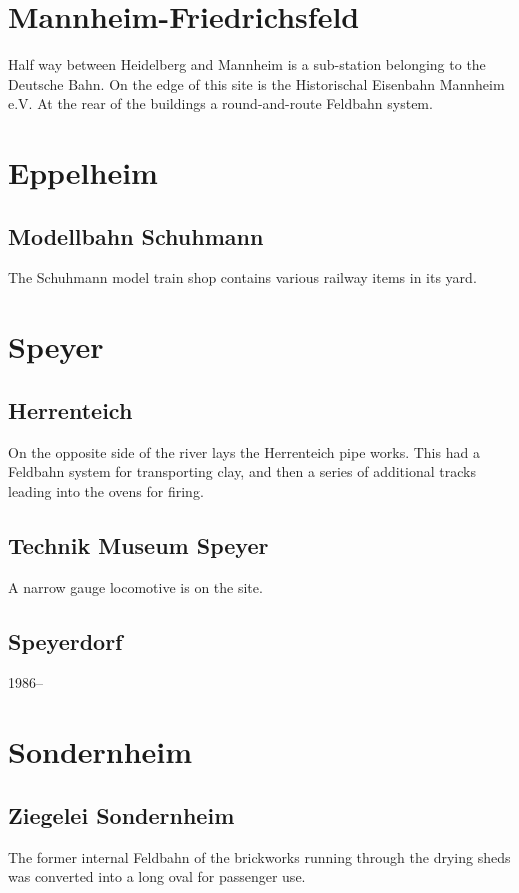 \documentclass[a4paper]{report}
\begin{document}
\section{Mannheim-Friedrichsfeld}

Half way between Heidelberg and Mannheim is a sub-station belonging to
the Deutsche Bahn.  On the edge of this site is the Historischal
Eisenbahn Mannheim e.V.  At the rear of the buildings a
round-and-route Feldbahn system.

\section{Eppelheim}

\subsection{Modellbahn Schuhmann}

The Schuhmann model train shop contains various railway items in its yard.

\section{Speyer}

\subsection{Herrenteich}

On the opposite side of the river lays the Herrenteich pipe works.
This had a Feldbahn system for transporting clay, and then a series of
additional tracks leading into the ovens for firing.

\subsection{Technik Museum Speyer}

A narrow gauge locomotive is on the site.

\subsection{Speyerdorf}

1986--

\section{Sondernheim}

\subsection{Ziegelei Sondernheim}

The former internal Feldbahn of the brickworks running through the
drying sheds was converted into a long oval for passenger use.


\nocite{*} 
\end{document}
